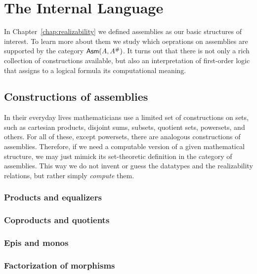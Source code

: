 \chapter{The Internal Language}
\label{chap:internal-language}

In Chapter~\ref{chap:realizability} we defined assemblies as our basic
structures of interest. To learn more about them we study which
oeprations on assemblies are supported by the category $\mathsf{Asm}(A,
  A^{\#})$. It turns out that there is not only a rich collection of
constructions available, but also an interpretation of first-order
logic that assigns to a logical formula its computational meaning.

\section{Constructions of assemblies}
\label{sec:constructions}

In their everyday lives mathematicians use a limited set of
constructions on sets, such as cartesian products, disjoint sums,
subsets, quotient sets, powersets, and others. For all of these,
except powersets, there are analogous constructions of assemblies.
Therefore, if we need a computable version of a given mathematical
structure, we may just mimick its set-theoretic definition in the
category of assemblies. This way we do not invent or guess the
datatypes and the realizability relations, but rather simply
\emph{compute} them.

\subsection{Products and equalizers}
\label{sec:products-equalizers}




\subsection{Coproducts and quotients}
\label{sec:products-equalizers}


\subsection{Epis and monos}
\label{sec:epis-monos}


\subsection{Factorization of morphisms}
\label{sec:factorization}

